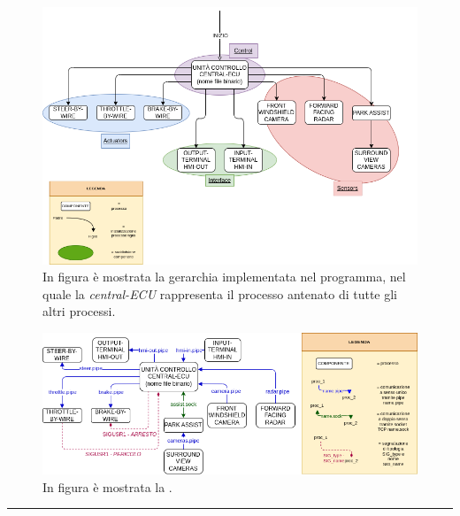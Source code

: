 \documentclass[11pt, openany]{article}
\theoremstyle{definition}
\theoremstyle{plain}
\theoremstyle{remark}
\begin{document}
			\begin{figure}[t]
				\includegraphics[scale=0.6, center]{./include/SO_Progetto_Diagrammi-Gerarchia.png}
				\caption{ In figura è mostrata la gerarchia implementata nel programma, nel quale la \textit{central-ECU} rappresenta il processo antenato di tutte gli altri processi.}
				\label{fig:gerarchia}
			\end{figure}



			\begin{figure}[h]
				\includegraphics[scale=0.6, center]{./include/SO_Progetto_Diagrammi-Comunicazione.png}
				\caption{ In figura è mostrata la .}
				\label{fig:comunicazione}
			\end{figure}


			\newpage


	\newpage
	\hrule
	\tableofcontents
\end{document}
